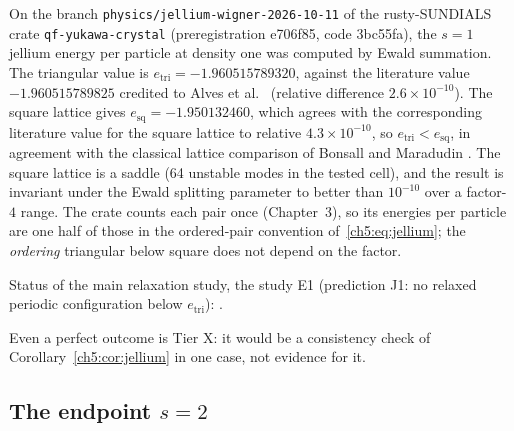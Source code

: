 \begin{numbox}[(2D Wigner crystal, $s=1$ jellium)]
\tierX{} On the branch \texttt{physics/jellium-wigner-2026-10-11} of the rusty-SUNDIALS crate
\texttt{qf-yukawa-crystal} \cite{rusty} (preregistration e706f85, code 3bc55fa), the $s=1$ jellium energy per
particle at density one was computed by Ewald summation. The triangular value is $e_{\mathrm{tri}}=-1.960515789320$,
against the literature value $-1.960515789825$ credited to Alves et al.\ \cite{alves} (relative difference
$2.6\times10^{-10}$). The square lattice gives $e_{\mathrm{sq}}=-1.950132460$, which agrees with the corresponding literature value for
the square lattice to relative $4.3\times10^{-10}$, so $e_{\mathrm{tri}}<e_{\mathrm{sq}}$, in agreement with the classical lattice comparison of
Bonsall and Maradudin \cite{bm}. The square lattice is a saddle (64 unstable modes in the tested cell), and the
result is invariant under the Ewald splitting parameter to better than $10^{-10}$ over a factor-$4$ range. The
crate counts each pair once (Chapter~3), so its energies per particle are one half of those in the ordered-pair
convention of~\eqref{ch5:eq:jellium}; the \emph{ordering} triangular below square does not depend on the factor.

Status of the main relaxation study, the study E1 (prediction J1: no relaxed periodic configuration below $e_{\mathrm{tri}}$):
\JelliumMainStatus.

Even a perfect outcome is Tier X: it would be a consistency check of Corollary~\ref{ch5:cor:jellium} in one case, not
evidence for it.
\end{numbox}

\subsection{The endpoint \texorpdfstring{$s=2$}{s=2}}

